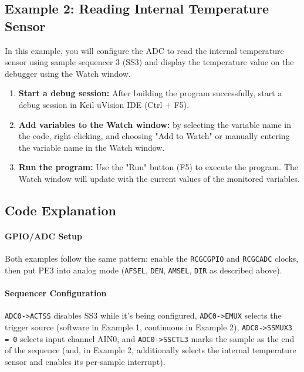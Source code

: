 \subsection{Example 2: Reading Internal Temperature Sensor}
In this example, you will configure the ADC to read the internal temperature sensor using sample sequencer 3 (SS3) and display the temperature value on the debugger using the Watch window. \\
\begin{enumerate}[nosep]
    \item \textbf{Start a debug session:} After building the program successfully, start a debug session in Keil uVision IDE (Ctrl + F5).
    \item \textbf{Add variables to the Watch window:} by selecting the variable name in the code, right-clicking, and choosing "Add to Watch" or manually entering the variable name in the Watch window.
    \item \textbf{Run the program:} Use the "Run" button (F5) to execute the program. The Watch window will update with the current values of the monitored variables. \\
\end{enumerate}




\pagestyle{empty} %

\pagestyle{plain} %

\subsection{Code Explanation}

\paragraph{GPIO/ADC Setup} Both examples follow the same pattern: enable the \texttt{RCGCGPIO} and \texttt{RCGCADC} clocks, then put PE3 into analog mode (\texttt{AFSEL}, \texttt{DEN}, \texttt{AMSEL}, \texttt{DIR} as described above).

\paragraph{Sequencer Configuration} \texttt{ADC0->ACTSS} disables SS3 while it's being configured, \texttt{ADC0->EMUX} selects the trigger source (software in Example 1, continuous in Example 2), \texttt{ADC0->SSMUX3 = 0} selects input channel AIN0, and \texttt{ADC0->SSCTL3} marks the sample as the end of the sequence (and, in Example 2, additionally selects the internal temperature sensor and enables its per-sample interrupt).

